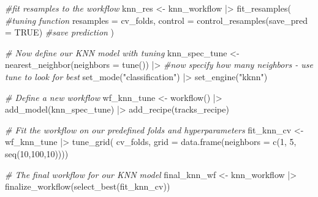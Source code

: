 \documentclass[
]{article}
\newenvironment{Shaded}{\begin{snugshade}}{\end{snugshade}}
\newcommand{\AttributeTok}[1]{\textcolor[rgb]{0.77,0.63,0.00}{#1}}
\newcommand{\CommentTok}[1]{\textcolor[rgb]{0.56,0.35,0.01}{\textit{#1}}}
\newcommand{\ConstantTok}[1]{\textcolor[rgb]{0.00,0.00,0.00}{#1}}
\newcommand{\DecValTok}[1]{\textcolor[rgb]{0.00,0.00,0.81}{#1}}
\newcommand{\FunctionTok}[1]{\textcolor[rgb]{0.00,0.00,0.00}{#1}}
\newcommand{\NormalTok}[1]{#1}
\newcommand{\OtherTok}[1]{\textcolor[rgb]{0.56,0.35,0.01}{#1}}
\newcommand{\SpecialCharTok}[1]{\textcolor[rgb]{0.00,0.00,0.00}{#1}}
\newcommand{\StringTok}[1]{\textcolor[rgb]{0.31,0.60,0.02}{#1}}
\begin{document}
\begin{Shaded}
\begin{Highlighting}[]
\CommentTok{\#fit resamples to the workflow}
\NormalTok{knn\_res }\OtherTok{\textless{}{-}} 
\NormalTok{  knn\_workflow }\SpecialCharTok{|\textgreater{}} 
  \FunctionTok{fit\_resamples}\NormalTok{( }\CommentTok{\#tuning function}
    \AttributeTok{resamples =}\NormalTok{ cv\_folds,}
    \AttributeTok{control =} \FunctionTok{control\_resamples}\NormalTok{(}\AttributeTok{save\_pred =} \ConstantTok{TRUE}\NormalTok{) }\CommentTok{\#save prediction}
\NormalTok{    )}

\CommentTok{\# Now define our KNN model with tuning}
\NormalTok{knn\_spec\_tune }\OtherTok{\textless{}{-}} 
  \FunctionTok{nearest\_neighbor}\NormalTok{(}\AttributeTok{neighbors =} \FunctionTok{tune}\NormalTok{()) }\SpecialCharTok{|\textgreater{}}  \CommentTok{\#now specify how many neighbors {-} use tune to look for best}
  \FunctionTok{set\_mode}\NormalTok{(}\StringTok{"classification"}\NormalTok{) }\SpecialCharTok{|\textgreater{}} 
  \FunctionTok{set\_engine}\NormalTok{(}\StringTok{"kknn"}\NormalTok{)}

\CommentTok{\# Define a new workflow}
\NormalTok{wf\_knn\_tune }\OtherTok{\textless{}{-}} \FunctionTok{workflow}\NormalTok{() }\SpecialCharTok{|\textgreater{}} 
  \FunctionTok{add\_model}\NormalTok{(knn\_spec\_tune) }\SpecialCharTok{|\textgreater{}} 
  \FunctionTok{add\_recipe}\NormalTok{(tracks\_recipe) }

\CommentTok{\# Fit the workflow on our predefined folds and hyperparameters}
\NormalTok{fit\_knn\_cv }\OtherTok{\textless{}{-}}\NormalTok{ wf\_knn\_tune }\SpecialCharTok{|\textgreater{}} 
  \FunctionTok{tune\_grid}\NormalTok{( }
\NormalTok{    cv\_folds,}
    \AttributeTok{grid =} \FunctionTok{data.frame}\NormalTok{(}\AttributeTok{neighbors =} \FunctionTok{c}\NormalTok{(}\DecValTok{1}\NormalTok{, }\DecValTok{5}\NormalTok{, }\FunctionTok{seq}\NormalTok{(}\DecValTok{10}\NormalTok{,}\DecValTok{100}\NormalTok{,}\DecValTok{10}\NormalTok{)))) }
\end{Highlighting}
\end{Shaded}

\begin{Shaded}
\begin{Highlighting}[]
\CommentTok{\# The final workflow for our KNN model}
\NormalTok{final\_knn\_wf }\OtherTok{\textless{}{-}} 
\NormalTok{  knn\_workflow }\SpecialCharTok{|\textgreater{}} 
  \FunctionTok{finalize\_workflow}\NormalTok{(}\FunctionTok{select\_best}\NormalTok{(fit\_knn\_cv))}
\end{Highlighting}
\end{Shaded}
\end{document}
